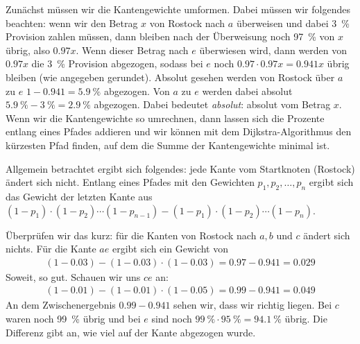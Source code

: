 \documentclass[
a4paper, %
11pt,
]
{scrartcl}
\begin{document}
Zunächst müssen wir die Kantengewichte umformen. Dabei müssen wir folgendes
beachten: wenn wir den Betrag $x$ von Rostock nach $a$ überweisen und dabei
\SI{3}{\percent} Provision zahlen müssen, dann bleiben nach der Überweisung noch
\SI{97}{\percent} von $x$ übrig, also $\num{0,97} x$. Wenn dieser Betrag nach
$e$ überwiesen wird, dann werden von $\num{0,97} x$ die \SI{3}{\percent}
Provision abgezogen, sodass bei $e$ noch $\num{0,97} \cdot \num{0,97} x =
\num{0,941} x$ übrig bleiben (wie angegeben gerundet). Absolut gesehen werden
von Rostock über $a$ zu $e$ \quad $1-\num{0,941} = \SI{5,9}{\percent}$
abgezogen. Von $a$ zu $e$ werden dabei absolut $\SI{5,9}{\percent} -
\SI{3}{\percent} = \SI{2,9}{\percent}$ abgezogen. Dabei bedeutet
\textit{absolut}: absolut vom Betrag $x$. Wenn wir die Kantengewichte so
umrechnen, dann lassen sich die Prozente entlang eines Pfades addieren und wir
können mit dem Dijkstra-Algorithmus den kürzesten Pfad finden, auf dem die Summe
der Kantengewichte minimal ist.

Allgemein betrachtet ergibt sich folgendes: jede Kante vom Startknoten (Rostock)
ändert sich nicht. Entlang eines Pfades mit den Gewichten $p_1, p_2, \ldots,
p_n$ ergibt sich das Gewicht der letzten Kante aus
$(1-p_1) \cdot (1-p_2) \cdots (1-p_{n-1})
- (1-p_1) \cdot (1-p_2) \cdots (1-p_n)$.

Überprüfen wir das kurz: für die Kanten von Rostock nach $a, b$ und $c$ ändert
sich nichts. Für die Kante $ae$ ergibt sich ein Gewicht von
\begin{align*}
  (1-\num{0,03}) - (1-\num{0,03}) \cdot (1-\num{0,03})
  = \num{0,97} - \num{0,941}
  = \num{0,029}
\end{align*}
Soweit, so gut. Schauen wir uns $ce$ an:
\begin{align*}
  (1-\num{0,01}) - (1-\num{0,01}) \cdot (1-\num{0,05})
  = \num{0,99} - \num{0,941}
  = \num{0,049}
\end{align*}
An dem Zwischenergebnis $\num{0,99} - \num{0,941}$ sehen wir, dass wir richtig
liegen. Bei $c$ waren noch \SI{99}{\percent} übrig und bei $e$ sind noch
$\SI{99}{\percent} \cdot \SI{95}{\percent} = \SI{94,1}{\percent}$ übrig. Die
Differenz gibt an, wie viel auf der Kante abgezogen wurde.
\end{document}

